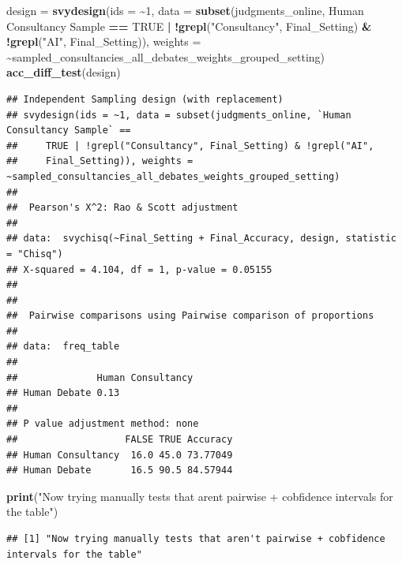 \documentclass[
]{article}
\newenvironment{Shaded}{\begin{snugshade}}{\end{snugshade}}
\newcommand{\AttributeTok}[1]{\textcolor[rgb]{0.13,0.29,0.53}{#1}}
\newcommand{\ConstantTok}[1]{\textcolor[rgb]{0.56,0.35,0.01}{#1}}
\newcommand{\DecValTok}[1]{\textcolor[rgb]{0.00,0.00,0.81}{#1}}
\newcommand{\FunctionTok}[1]{\textcolor[rgb]{0.13,0.29,0.53}{\textbf{#1}}}
\newcommand{\NormalTok}[1]{#1}
\newcommand{\OtherTok}[1]{\textcolor[rgb]{0.56,0.35,0.01}{#1}}
\newcommand{\SpecialCharTok}[1]{\textcolor[rgb]{0.81,0.36,0.00}{\textbf{#1}}}
\newcommand{\StringTok}[1]{\textcolor[rgb]{0.31,0.60,0.02}{#1}}
\begin{document}
\begin{Shaded}
\begin{Highlighting}[]
\NormalTok{design }\OtherTok{=} \FunctionTok{svydesign}\NormalTok{(}\AttributeTok{ids =} \SpecialCharTok{\textasciitilde{}}\DecValTok{1}\NormalTok{, }\AttributeTok{data =} \FunctionTok{subset}\NormalTok{(judgments\_online, }\StringTok{\textasciigrave{}}\AttributeTok{Human Consultancy Sample}\StringTok{\textasciigrave{}} \SpecialCharTok{==} \ConstantTok{TRUE} \SpecialCharTok{|} \SpecialCharTok{!}\FunctionTok{grepl}\NormalTok{(}\StringTok{"Consultancy"}\NormalTok{, Final\_Setting) }\SpecialCharTok{\&} \SpecialCharTok{!}\FunctionTok{grepl}\NormalTok{(}\StringTok{"AI"}\NormalTok{, Final\_Setting)), }\AttributeTok{weights =} \SpecialCharTok{\textasciitilde{}}\NormalTok{sampled\_consultancies\_all\_debates\_weights\_grouped\_setting)}
\FunctionTok{acc\_diff\_test}\NormalTok{(design)}
\end{Highlighting}
\end{Shaded}

\begin{verbatim}
## Independent Sampling design (with replacement)
## svydesign(ids = ~1, data = subset(judgments_online, `Human Consultancy Sample` == 
##     TRUE | !grepl("Consultancy", Final_Setting) & !grepl("AI", 
##     Final_Setting)), weights = ~sampled_consultancies_all_debates_weights_grouped_setting)
## 
##  Pearson's X^2: Rao & Scott adjustment
## 
## data:  svychisq(~Final_Setting + Final_Accuracy, design, statistic = "Chisq")
## X-squared = 4.104, df = 1, p-value = 0.05155
## 
## 
##  Pairwise comparisons using Pairwise comparison of proportions 
## 
## data:  freq_table 
## 
##              Human Consultancy
## Human Debate 0.13             
## 
## P value adjustment method: none 
##                   FALSE TRUE Accuracy
## Human Consultancy  16.0 45.0 73.77049
## Human Debate       16.5 90.5 84.57944
\end{verbatim}

\begin{Shaded}
\begin{Highlighting}[]
\FunctionTok{print}\NormalTok{(}\StringTok{"Now trying manually tests that aren\textquotesingle{}t pairwise + cobfidence intervals for the table"}\NormalTok{)}
\end{Highlighting}
\end{Shaded}

\begin{verbatim}
## [1] "Now trying manually tests that aren't pairwise + cobfidence intervals for the table"
\end{verbatim}
\end{document}
